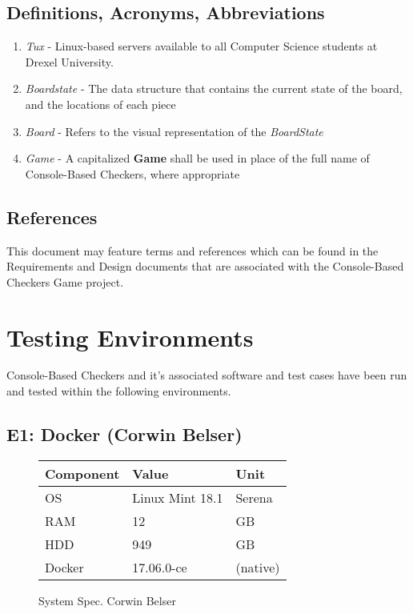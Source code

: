 \documentclass[letterpaper]{article}
\begin{document}
\subsection{Definitions, Acronyms, Abbreviations}
\label{sec:intro_definitions}

\begin{enumerate}
	\item \emph{Tux} - Linux-based servers available to all Computer
    	  Science students at Drexel University.
          
    \item \emph{Boardstate} - The data structure that contains
          the current state of the board, and the locations of
          each piece
    
    \item \emph{Board} - Refers to the visual representation of
          the \emph{BoardState}
           
    \item \emph{Game} - A capitalized \textbf{Game} shall be
          used in place of the full name of Console-Based
          Checkers, where appropriate
\end{enumerate}

\subsection{References}
\label{sec:intro_references}
This document may feature terms and references which can be
found in the Requirements and Design documents that are
associated with the Console-Based Checkers Game project.


\section{Testing Environments}
\label{sec:environment}

Console-Based Checkers and it's associated software and test 
cases have been run and tested within the following environments.

\subsection{E1: Docker (Corwin Belser)}
\label{sec:environment_corwin}

\begin{figure}
\centering
\begin{tabulary}{\linewidth}{LLL}
    Component & Value         & Unit     \\
    \hline
    OS     	  & Linux Mint 18.1 & Serena      \\
    RAM       & 12              & GB       \\
    HDD       & 949      	    & GB       \\
    Docker    & 17.06.0-ce    & (native) \\
\end{tabulary}
\caption{System Spec. Corwin Belser}
\label{fig:environment_corwin}
\end{figure}
\end{document}
